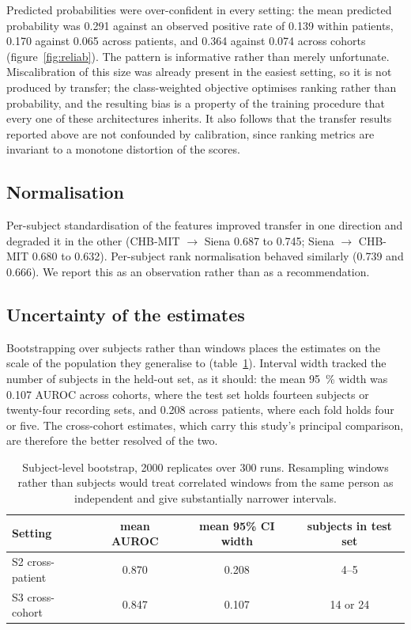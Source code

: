 \documentclass[11pt,a4paper]{article}
\begin{document}
Predicted probabilities were over-confident in every setting: the mean
predicted probability was 0.291 against an observed positive rate of 0.139
within patients, 0.170 against 0.065 across patients, and 0.364 against
0.074 across cohorts (figure~\ref{fig:reliab}). The pattern is informative
rather than merely unfortunate. Miscalibration of this size was already
present in the easiest setting, so it is not produced by transfer; the
class-weighted objective optimises ranking rather than probability, and the
resulting bias is a property of the training procedure that every one of
these architectures inherits. It also follows that the transfer results
reported above are not confounded by calibration, since ranking metrics are
invariant to a monotone distortion of the scores.

\subsection{Normalisation}

Per-subject standardisation of the features improved transfer in one direction
and degraded it in the other (CHB-MIT $\rightarrow$ Siena 0.687 to 0.745;
Siena $\rightarrow$ CHB-MIT 0.680 to 0.632). Per-subject rank normalisation
behaved similarly (0.739 and 0.666). We report this as an observation rather
than as a recommendation.

\subsection{Uncertainty of the estimates}

Bootstrapping over subjects rather than windows places the estimates on the
scale of the population they generalise to (table~\ref{tab:ci}). Interval
width tracked the number of subjects in the held-out set, as it should: the
mean \SI{95}{\percent} width was 0.107 AUROC across cohorts, where the test
set holds fourteen subjects or twenty-four recording sets, and 0.208 across
patients, where
each fold holds four or five. The cross-cohort estimates, which carry this
study's principal comparison, are therefore the better resolved of the two.

\begin{table}[t]
\centering\small
\caption{Subject-level bootstrap, 2000 replicates over 300 runs. Resampling
windows rather than subjects would treat correlated windows from the same
person as independent and give substantially narrower intervals.}
\label{tab:ci}
\begin{tabular}{lccc}
\toprule
Setting & mean AUROC & mean 95\% CI width & subjects in test set \\
\midrule
S2 cross-patient & 0.870 & 0.208 & 4--5 \\
S3 cross-cohort  & 0.847 & 0.107 & 14 or 24 \\
\bottomrule
\end{tabular}
\end{table}
\end{document}

